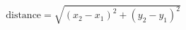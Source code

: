 \documentclass[preview]{standalone}
\begin{document}
\begin{align*}
\text{distance} = \sqrt{(x_2-x_1)^2 + (y_2-y_1)^2}
\end{align*}
\end{document}
